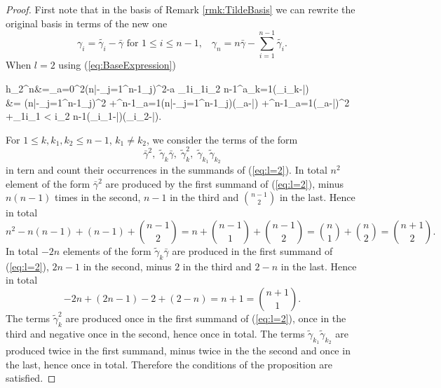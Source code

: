 \documentclass{article}
\theoremstyle{plain}
\theoremstyle{definition}
\numberwithin{thm}{section}
\begin{document}
			\begin{proof}
				First note that in the basis of Remark \ref{rmk:TildeBasis} we can rewrite the original basis in terms of the new one
				\begin{equation}\label{eq:BaseExpression}
					\gamma_i=\tilde{\gamma_i}-\bar{\gamma} \text{  for  } 1\leq i\leq n-1, \;\;\; \gamma_n=n\bar{\gamma}-\sum_{i=1}^{n-1}{\tilde{\gamma_i}}.
				\end{equation}
				When $l=2$ using (\ref{eq:BaseExpression})
				\begin{flalign}
					h_2^{n}&=\sum_{a=0}^{2}{\big{(}(n\bar{\gamma}-\sum_{j=1}^{n-1}{\tilde{\gamma}_j})^{2-a}
					\sum_{1\leq i_1\leq i_2 \leq n-1}{\prod^a_{k=1}{(\tilde{\gamma}_{i_k}-\bar{\gamma})}}\big{)}} \nonumber \\
					&= (n\bar{\gamma}-\sum_{j=1}^{n-1}{\tilde{\gamma}_j})^{2}
						+\sum^{n-1}_{a=1}{(n\bar{\gamma}-\sum_{j=1}^{n-1}{\tilde{\gamma}_j})(\tilde{\gamma}_a-\bar{\gamma})}
						+\sum^{n-1}_{a=1}{(\tilde{\gamma}_{a}-\bar{\gamma})^2}
						+\sum_{1\leq i_1 < i_2 \leq n-1}{(\tilde{\gamma}_{i_1}-\bar{\gamma})(\tilde{\gamma}_{i_2}-\bar{\gamma})}. \label{eq:l=2}
				\end{flalign}
				For $1\leq k,k_1, k_2\leq n-1$, $k_1 \neq k_2$,
				we consider the terms of the form 
				\begin{equation*}
					\bar{\gamma}^2, \; \tilde{\gamma}_k\bar{\gamma}, \; \tilde{\gamma}_k^2, \; \tilde{\gamma}_{k_1}\tilde{\gamma}_{k_2}
				\end{equation*}
				in tern and count their occurrences in the summands of (\ref{eq:l=2}).
				In total $n^2$ element of the form $\bar{\gamma}^2$ are produced by the first summand of (\ref{eq:l=2}),
				minus $n(n-1)$ times in the second, $n-1$ in the third and $\binom{n-1}{2}$ in the last.   
				Hence in total
				\begin{equation*}
					n^2-n(n-1)+(n-1)+\binom{n-1}{2}=n+\binom{n-1}{1}+\binom{n-1}{2}=\binom{n}{1}+\binom{n}{2}=\binom{n+1}{2}.
				\end{equation*}
				In total $-2n$ elements of the form $\tilde{\gamma}_k\bar{\gamma}$ are produced in the first summand of (\ref{eq:l=2}),
				$2n-1$ in the second, minus $2$ in the third and $2-n$ in the last.
				Hence in total
				\begin{equation*}
					-2n+(2n-1)-2+(2-n)=n+1=\binom{n+1}{1}.
				\end{equation*}
				The terms $\tilde{\gamma}_k^2$ are produced once in the first summand of (\ref{eq:l=2}), once in the third and negative once in the second,
				hence once in total.
				The terms $\tilde{\gamma}_{k_1}\tilde{\gamma}_{k_2}$ are produced twice in the first summand,
				minus twice in the the second and once in the last,
				hence once in total.
				Therefore the conditions of the proposition are satisfied.
				

\end{proof}
\end{document}
